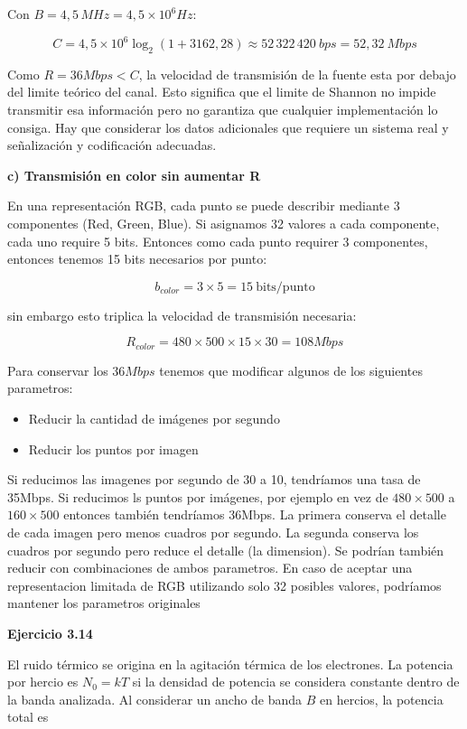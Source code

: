 \documentclass[11pt,a4paper]{article}
\begin{document}
Con $B=4,5\,MHz=4,5\times10^6Hz$:

$$C=4{,}5\times10^6\log_2(1+3162{,}28) \approx\boxed{52\,322\,420\ bps=52{,}32\ Mbps}$$

Como $R=36Mbps<C$, la velocidad de transmisión de la fuente esta por debajo del limite teórico del canal. Esto significa que el limite de Shannon no impide transmitir esa información pero no garantiza que cualquier implementación lo consiga. Hay que considerar los datos adicionales que requiere un sistema real y señalización y codificación adecuadas.

\noindent\textbf{c) Transmisión en color sin aumentar R}

En una representación RGB, cada punto se puede describir mediante 3 componentes (Red, Green, Blue). Si asignamos 32 valores a cada componente, cada uno require 5 bits. Entonces como cada punto requirer 3 componentes, entonces tenemos 15 bits necesarios por punto:

$$b_{color}=3\times 5 = 15\ \text{bits/punto}$$

sin embargo esto triplica la velocidad de transmisión necesaria:

$$R_{color}=480\times500\times15\times30=108Mbps$$

Para conservar los $36Mbps$ tenemos que modificar algunos de los siguientes parametros:
\begin{itemize}
  \item Reducir la cantidad de imágenes por segundo
  \item Reducir los puntos por imagen
\end{itemize}

Si reducimos las imagenes por segundo de 30 a 10, tendríamos una tasa de 35Mbps. Si reducimos ls puntos por imágenes, por ejemplo en vez de $480\times500$ a $160\times500$ entonces también tendríamos 36Mbps. La primera conserva el detalle de cada imagen pero menos cuadros por segundo. La segunda conserva los cuadros por segundo pero reduce el detalle (la dimension). Se podrían también reducir con combinaciones de ambos parametros. En caso de aceptar una representacion limitada de RGB utilizando solo 32 posibles valores, podríamos mantener los parametros originales

\vspace{0.3cm}
\noindent\textbf{Ejercicio 3.14}\par
El ruido térmico se origina en la agitación térmica de los electrones. La potencia por hercio es $N_0=kT$ si la densidad de potencia se considera constante dentro de la banda analizada. Al considerar un ancho de banda $B$ en hercios, la potencia total es
\end{document}
